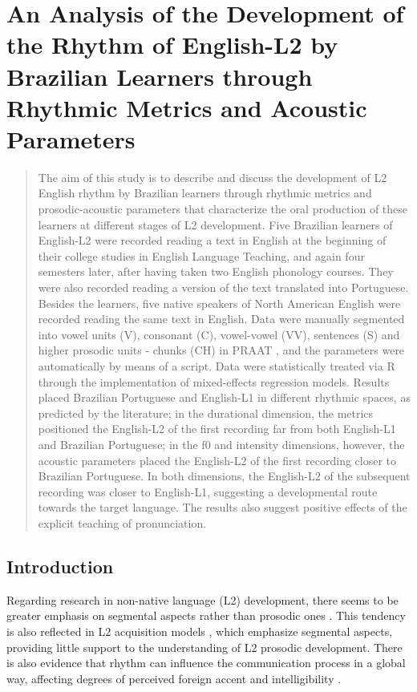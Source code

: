 \chapter{An Analysis of the Development of the Rhythm of English-L2 by Brazilian Learners through Rhythmic Metrics and Acoustic Parameters}\label{ch:leonardoanton9}
\begin{affils}
\end{affils}

\begin{abstract}
The aim of this study is to describe and discuss the development of L2 English
rhythm by Brazilian learners through rhythmic metrics and prosodic-acoustic
parameters that characterize the oral production of these learners at different
stages of L2 development. Five Brazilian learners of English-L2 were recorded
reading a text in English at the beginning of their college studies in English
Language Teaching, and again four semesters later, after having taken two
English phonology courses. They were also recorded reading a version of the
text translated into Portuguese. Besides the learners, five native speakers of
North American English were recorded reading the same text in English. Data
were manually segmented into vowel units (V), consonant (C), vowel-vowel (VV),
sentences (S) and higher prosodic units - chunks (CH) in PRAAT \citep{boersma_praat},
and the parameters were automatically by means of a script.
Data were statistically treated via R \citep{r2021}%
through the implementation of mixed-effects regression models. Results placed Brazilian
Portuguese and English-L1 in different rhythmic spaces, as predicted by the
literature; in the durational dimension, the metrics positioned the English-L2
of the first recording far from both English-L1 and Brazilian Portuguese; in
the f0 and intensity dimensions, however, the acoustic parameters placed the
English-L2 of the first recording closer to Brazilian Portuguese. In both
dimensions, the English-L2 of the subsequent recording was closer to
English-L1, suggesting a developmental route towards the target language. The
results also suggest positive effects of the explicit teaching of
pronunciation.
\end{abstract}



\section{Introduction}
Regarding research in non-native language (L2) development, there seems to be
greater emphasis on segmental aspects rather than prosodic ones \citep{li2014,thomson2015}.
This tendency is also reflected in L2
acquisition models \citep{flege2021,best2007}, 
which emphasize segmental aspects, providing little support to the understanding of L2 prosodic
development. There is also evidence that rhythm can influence the communication
process in a global way, affecting degrees of perceived foreign accent and
intelligibility \citep{silva2020}.

